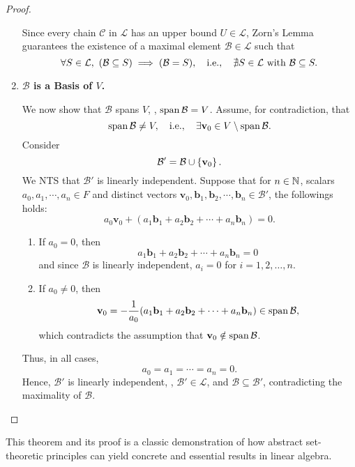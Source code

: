 \documentclass[11pt,openany]{article}
\renewcommand{\vec}[1]{\mathbf{#1}}
\begin{document}
\begin{proof}
\begin{enumerate}[Step 1]
	Since every chain $\mathcal{C}$ in $\mathcal{L}$ has an upper bound $U\in\mathcal{L}$, Zorn's Lemma guarantees the existence of a maximal element $\mathcal{B}\in\mathcal{L}$ such that \[
	\forall S\in\mathcal{L},\ (\mathcal{B}\subseteq S)\implies (\mathcal{B}=S),\quad\ie,\quad\nexists S\in\mathcal{L}\ \text{with}\ \mathcal{B}\subseteq S.
	\]
	\item \textbf{$\mathcal{B}$ is a Basis of $V$.}
	
	We now show that $\mathcal{B}$ spans $V$, \ie, $\operatorname{\normalfont span}\mathcal{B}=V$. Assume, for contradiction, that \[
	\Span\mathcal{B}\neq V,\quad\ie,\quad\exists\vec{v}_0\in V\setminus\Span\mathcal{B}.
	\] Consider \[
	\mathcal{B}'=\mathcal{B}\cup\set{\vec{v}_0}.
	\] We NTS that $\mathcal{B}'$ is linearly independent. Suppose that for $n\in\mathbb{N}$, scalars $a_0,a_1,\cdots,a_n\in F$ and distinct vectors $\vec{v}_0,\vec{b}_1,\vec{b}_2,\cdots,\vec{b}_n\in\mathcal{B}'$, the followings holds: \[
	a_0\vec{v}_0+(a_1\vec{b}_1+a_2\vec{b}_2+\cdots+a_n\vec{b}_n)=0.
	\] \begin{enumerate}
		\item If $a_0=0$, then \[
		a_1\vec{b}_1+a_2\vec{b}_2+\cdots+a_n\vec{b}_n=0
		\] and since $\mathcal{B}$ is linearly independent, $a_i=0$ for $i=1,2,\dots, n$.
		\item If $a_0\neq 0$, then \[
		\vec{v}_0=-\frac{1}{a_0}(a_1\vec{b}_1+a_2\vec{b}_2+\cdots+a_n\vec{b}_n)\in\Span\mathcal{B},
		\] which contradicts the assumption that $\vec{v}_0\notin\Span\mathcal{B}$.
	\end{enumerate}
	Thus, in all cases, \[
	a_0=a_1=\cdots=a_n=0.
	\] Hence, $\mathcal{B}'$ is linearly independent, \ie, $\mathcal{B}'\in\mathcal{L}$, and $\mathcal{B}\subseteq\mathcal{B}'$, contradicting the maximality of $\mathcal{B}$.
\end{enumerate}

\end{proof}
\begin{remark*}
	This theorem and its proof is a classic demonstration of how abstract set-theoretic principles can yield concrete and essential results in linear algebra.
\end{remark*}
\vspace{40pt}
\end{document}
